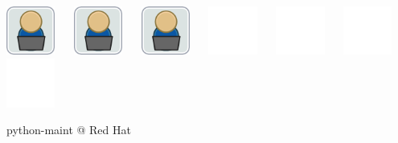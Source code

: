 \documentclass[1610,20pt]{beamer}
\newcommand\sk{\par\bigskip\bigskip\par}
\begin{document}
\begin{center}
\begin{frame}[fragile]
    \includegraphics[width=0.12\textwidth]{Join_OSDeveloper} ~~
    \includegraphics[width=0.12\textwidth]{Join_OSDeveloper} ~~
    \includegraphics[width=0.12\textwidth]{Join_OSDeveloper} ~~ 
    \includegraphics[width=0.12\textwidth]{Join_OSDeveloper-no} ~~
    \includegraphics[width=0.12\textwidth]{Join_OSDeveloper-no} ~~
    \includegraphics[width=0.12\textwidth]{Join_OSDeveloper-no} ~~
    \includegraphics[width=0.12\textwidth]{Join_OSDeveloper-no}
\end{frame}

\begin{frame}[fragile]
    python-maint @ Red Hat
    \sk


\end{frame}
\end{center}
\end{document}
